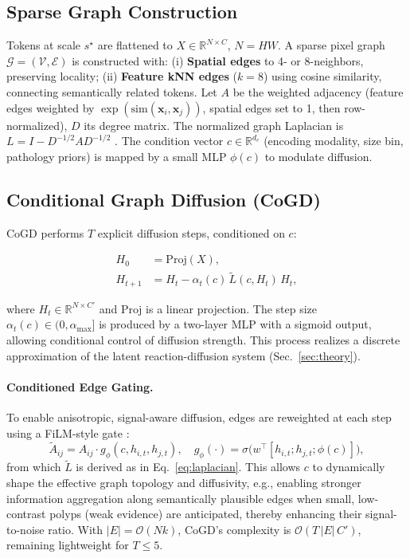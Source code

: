 \documentclass{article}
\begin{document}
\subsection{Sparse Graph Construction}
Tokens at scale $s^\star$ are flattened to $X \in \mathbb{R}^{N\times C}$, $N=HW$. A sparse pixel graph $\mathcal{G}=(\mathcal{V},\mathcal{E})$ is constructed with: (i) \textbf{Spatial edges} to 4- or 8-neighbors, preserving locality; (ii) \textbf{Feature kNN edges} ($k=8$) using cosine similarity, connecting semantically related tokens. Let $A$ be the weighted adjacency (feature edges weighted by $\exp(\mathrm{sim}(\mathbf{x}_i,\mathbf{x}_j))$, spatial edges set to 1, then row-normalized), $D$ its degree matrix. The normalized graph Laplacian is $L = I - D^{-1/2} A D^{-1/2}$ \cite{Kipf2017GCN}. \label{eq:laplacian} The condition vector $c\in\mathbb{R}^{d_c}$ (encoding modality, size bin, pathology priors) is mapped by a small MLP $\phi(c)$ to modulate diffusion.

\subsection{Conditional Graph Diffusion (CoGD)}
\label{subsec:cogd}
CoGD performs $T$ explicit diffusion steps, conditioned on $c$:

\begin{equation}
\label{eq:diffusion}
\begin{split}
H_{0} &= \mathrm{Proj}(X), \\
H_{t+1} &= H_{t} - \alpha_t(c)\,\widetilde{L}(c, H_{t})\,H_{t},
\end{split}
\end{equation}

where $H_t\in\mathbb{R}^{N\times C'}$ and $\mathrm{Proj}$ is a linear projection. The step size $\alpha_t(c)\in(0,\alpha_{\max}]$ is produced by a two-layer MLP with a sigmoid output, allowing conditional control of diffusion strength. This process realizes a discrete approximation of the latent reaction-diffusion system (Sec.~\ref{sec:theory}).

\paragraph{Conditioned Edge Gating.}
To enable anisotropic, signal-aware diffusion, edges are reweighted at each step using a FiLM-style gate \cite{Perez2018FiLM}:
\begin{equation}
\widetilde{A}_{ij}
= A_{ij}\cdot g_\phi\!\left(c, h_{i,t}, h_{j,t}\right), \quad
g_\phi(\cdot)=\sigma\!\big(w^\top [h_{i,t};h_{j,t};\phi(c)]\big),
\end{equation}
from which $\widetilde{L}$ is derived as in Eq.~\eqref{eq:laplacian}. This allows $c$ to dynamically shape the effective graph topology and diffusivity, e.g., enabling stronger information aggregation along semantically plausible edges when small, low-contrast polyps (weak evidence) are anticipated, thereby enhancing their signal-to-noise ratio. With $|E|=\mathcal{O}(Nk)$, CoGD's complexity is $\mathcal{O}\!\left(T\,|E|\,C'\right)$, remaining lightweight for $T\le 5$.
\end{document}
